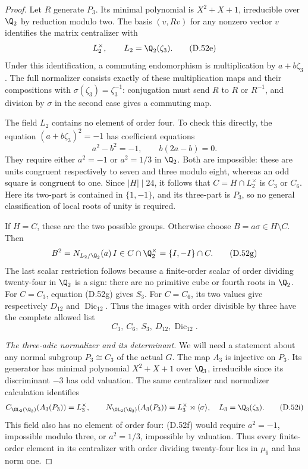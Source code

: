 \begin{proof}
Let $R$ generate $P_3$.
Its minimal polynomial is
$X^2+X+1$, irreducible over $\Q_2$ by
reduction modulo two.
The basis $(v,Rv)$ for any nonzero vector $v$
identifies the matrix centralizer with
\[
 L_2^\times,\qquad L_2=\Q_2(\zeta_3).
                                                               \tag{D.52e}
\]
Under this identification, a commuting
endomorphism is multiplication by $a+b\zeta_3$.
The full normalizer consists exactly of these
multiplication maps and their compositions
with $\sigma(\zeta_3)=\zeta_3^{-1}$:
conjugation must send $R$ to $R$ or $R^{-1}$,
and division by $\sigma$ in the second case
gives a commuting map.

The field $L_2$ contains no element of order
four. To check this directly, the equation
$(a+b\zeta_3)^2=-1$ has coefficient equations
\[
                   a^2-b^2=-1,\qquad b(2a-b)=0.
                                                               \tag{D.52f}
\]
They require either $a^2=-1$ or $a^2=1/3$
in $\Q_2$. Both are impossible: these are
units congruent respectively to seven and
three modulo eight, whereas an odd square
is congruent to one.
Since $|H|\mid24$, it follows that
$C=H\cap L_2^\times$ is $C_3$ or $C_6$.
Here its two-part is contained in
$\{1,-1\}$, and its three-part is $P_3$,
so no general classification of local
roots of unity is required.

If $H=C$, these are the two possible groups.
Otherwise choose $B=a\sigma\in H\setminus C$.
Then
\[
 B^2=N_{L_2/\Q_2}(a)\,I
        \in C\cap\Q_2^\times=\{I,-I\}\cap C.             \tag{D.52g}
\]
The last scalar restriction follows because
a finite-order scalar of order dividing
twenty-four in $\Q_2$ is a sign: there are
no primitive cube or fourth roots in $\Q_2$.
For $C=C_3$, equation (D.52g) gives $S_3$.
For $C=C_6$, its two values give respectively
$D_{12}$ and $\operatorname{Dic}_{12}$.
Thus the images with order divisible by
three have the complete allowed list
\[
                  C_3,\ C_6,\ S_3,\ D_{12},
                             \operatorname{Dic}_{12}.  \tag{D.52h}
\]

\emph{The three-adic normalizer and its determinant.}
We will need a statement about any normal
subgroup $P_3\cong C_3$ of the actual $G$.
The map $A_3$ is injective on $P_3$.
Its generator has minimal polynomial
$X^2+X+1$ over $\Q_3$, irreducible since
its discriminant $-3$ has odd valuation.
The same centralizer and normalizer
calculation identifies
\[
 C_{\GL_2(\Q_3)}(A_3(P_3))=L_3^\times,\qquad
 N_{\GL_2(\Q_3)}(A_3(P_3))=L_3^\times\rtimes\langle\sigma\rangle,
 \quad L_3=\Q_3(\zeta_3).                              \tag{D.52i}
\]
This field also has no element of order four:
(D.52f) would require $a^2=-1$, impossible
modulo three, or $a^2=1/3$, impossible by
valuation. Thus every finite-order element
in its centralizer with order dividing
twenty-four lies in $\mu_6$ and has norm one.


\end{proof}
